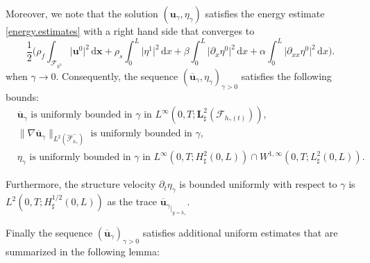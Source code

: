 \documentclass[JEP,XML,SOM,Unicode,NoFloatCountersInSection]{cedram}
\let\mathcal\mathscr
\theoremstyle{remark}
\theoremstyle{definition}
\newcommand{\ug}{\boldsymbol{u}}
\newcommand{\xg}{\boldsymbol{x}}
\newcommand{\dd}{\,\mathrm{d}}
\newcommand{\BS}[1]{\boldsymbol{#1}}
\begin{document}
Moreover, we note that the solution $(\ug_{\gamma},\eta_{\gamma})$ satisfies the energy estimate \eqref{energy.estimates} with a right hand side that converges to
\[
\frac{1}{2}\biggl(\rho_{f}\int_{\mathcal{F}_{h^0}}\vert\ug^0\vert^{2} \dd \xg+ \rho_{s}\int_{0}^{L}\vert\eta^1\vert^{2}\dd x+\beta\int_{0}^{L}\vert\partial_{x}\eta^0\vert^{2}\dd x+\alpha\int_{0}^{L}\vert\partial_{xx}\eta^0\vert^{2}\dd x\biggr).
\]
when $\gamma \to 0$.
Consequently, the sequence $(\overline{\ug}_{\gamma},\eta_{\gamma})_{\gamma >0}$ satisfies the following bounds:
\begin{align}
&\overline{\ug}_{\gamma}\text{ is uniformly bounded in }\gamma\text{ in }L^{\infty}(0,T;\BS{L}_\sharp^{2}(\mathcal{F}_{h_{\gamma}(t)})),\label{bound-u-1}\\
&\|\nabla\overline{\ug}_{\gamma}\|_{L^2(\widehat{\mathcal F}^{-}_{h_{\gamma}})} \text{ is uniformly bounded in }\gamma,
\label{bound-u-2}\\
&\eta_{\gamma}\text{ is uniformly bounded in }\gamma\text{ in }L^{\infty}(0,T;H^{2}_{\sharp}(0,L))\cap W^{1,\infty}(0,T;L_\sharp^{2}(0,L)).\label{est-eta}
\end{align}

Furthermore, the structure velocity $\partial_t\eta_\gamma$ is bounded uniformly with respect to $\gamma$ is $L^2(0, T ; H^{1/2}_\sharp(0, L))$ as the trace ${\overline{\ug}_{\gamma}}_{\vert_{y=h_{\gamma}}}$.

Finally the sequence $(\overline{\ug}_{\gamma})_{\gamma>0}$ satisfies additional uniform estimates that are summarized in the following lemma:
\end{document}
